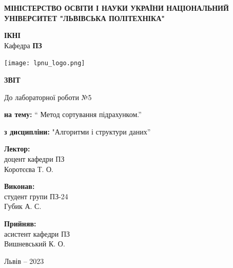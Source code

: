 \documentclass[12pt]{extarticle}
\begin{document}
\begin{titlepage}
    \begin{center}
        \textbf{\normalsize{\MakeUppercase{
            Міністерство Освіти і науки України
            Національний університет "Львівська політехніка"
        }}}

        \begin{flushright}
        \textbf{ІКНІ}\\
        Кафедра \textbf{ПЗ}
        \end{flushright}
        \vspace{15mm}

        \texttt{[image: lpnu\_logo.png]}

        \vspace*{\fill}

        \textbf{\normalsize{\MakeUppercase{Звіт}}}
            
        До лабораторної роботи №5

        \textbf{на тему:} “ Метод сортування підрахунком.”

        \textbf{з дисципліни:} "Алгоритми і структури даних”
            
        \vspace*{\fill}

        \begin{flushright}

            \textbf{Лектор:}\\
            доцент кафедри ПЗ\\
            Коротєєва Т. О.\\
            \vspace{12pt}

            \textbf{Виконав:}\\
            студент групи ПЗ-24\\
            Губик А. С.\\
            \vspace{12pt}

            \textbf{Прийняв:}\\
            асистент кафедри ПЗ\\
            Вишневський К. О.\\
        \vspace{12pt}
        \end{flushright}

        Львів -- 2023
            
            
    \end{center}
\end{titlepage}
\end{document}

